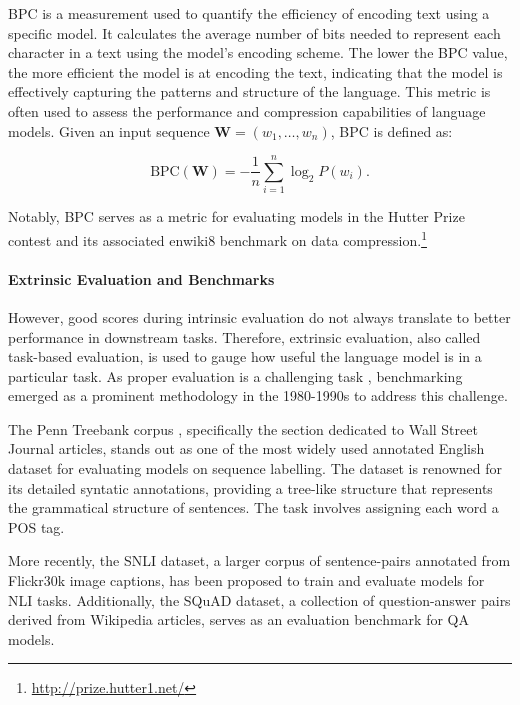\ac{BPC} is a measurement used to quantify the efficiency of encoding text using a specific model. It calculates the average number of bits needed to represent each character in a text using the model's encoding scheme. The lower the \ac{BPC} value, the more efficient the model is at encoding the text, indicating that the model is effectively capturing the patterns and structure of the language. This metric is often used to assess the performance and compression capabilities of language models. Given an input sequence $\bm{W} = (w_1, \ldots, w_n)$, \ac{BPC} is defined as:

\begin{equation}
    \text{BPC}(\bm{W}) = - \dfrac{1}{n} \sum_{i=1}^n \log_2 P(w_i).
\end{equation}

\noindent Notably, \ac{BPC} serves as a metric for evaluating models in the Hutter Prize contest and its associated enwiki8 benchmark on data compression.\footnote{\url{http://prize.hutter1.net/}}

\paragraph{Extrinsic Evaluation and Benchmarks} However, good scores during intrinsic evaluation do not always translate to better performance in downstream tasks. Therefore, extrinsic evaluation, also called task-based evaluation, is used to gauge how useful the language model is in a particular task. As proper evaluation is a challenging task \citep{jones2005some}, benchmarking emerged as a prominent methodology in the 1980-1990s to address this challenge. 

The Penn Treebank corpus \citep{marcus1993building}, specifically the section dedicated to Wall Street Journal articles, stands out as one of the most widely used annotated English dataset for evaluating models on sequence labelling. The dataset is renowned for its detailed syntatic annotations, providing a tree-like structure that represents the grammatical structure of sentences. The task involves assigning each word a \ac{POS} tag. 

More recently, the \ac{SNLI} dataset, a larger corpus of sentence-pairs annotated from Flickr30k image captions, has been proposed to train and evaluate models for \ac{NLI} tasks. Additionally, the \ac{SQuAD} \citep{rajpurkar2016squad} dataset, a collection of question-answer pairs derived from Wikipedia articles, serves as an evaluation benchmark for \ac{QA} models. 

